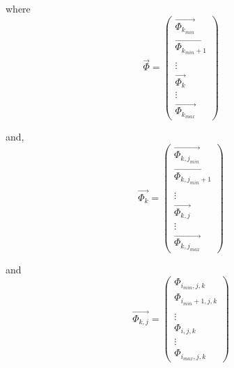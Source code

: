 \documentclass{article}
\numberwithin{equation}{subsection}
\begin{document}
where 
\begin{equation}
\vec{\Phi} =
\begin{pmatrix}
\overrightarrow{\Phi_{k_{min}}} \\ \overrightarrow{\Phi_{k_{min}+1}} \\  \\\vdots \\ \overrightarrow{\Phi_{k}}  \\\vdots \\ \overrightarrow{\Phi_{k_{max}}}
\end{pmatrix}
\end{equation}


and,
\begin{equation}
\overrightarrow{\Phi_k} =
\begin{pmatrix}
\overrightarrow{\Phi_{k,j_{min}}} \\ \overrightarrow{\Phi_{k,j_{min}+1}} \\ \\\vdots \\ \overrightarrow{\Phi_{k,j}}  \\\vdots \\ \overrightarrow{\Phi_{k,j_{max}}}
\end{pmatrix}
\end{equation}


and
\begin{equation}
\overrightarrow{\Phi_{k,j}} = 
\begin{pmatrix}
\Phi_{i_{min},j,k} \\ \Phi_{i_{min}+1,j,k} \\ \\\vdots \\ \Phi_{i,j,k} \\\vdots \\ \Phi_{i_{max},j,k}
\end{pmatrix}
\end{equation}
\end{document}
